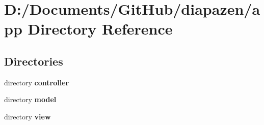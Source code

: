 \section{D\-:/\-Documents/\-Git\-Hub/diapazen/app Directory Reference}
\label{dir_c4a1f68e68402fc978bb0bb178f18d28}
\subsection*{Directories}
\begin{DoxyCompactItemize}
\item 
directory {\bf controller}
\item 
directory {\bf model}
\item 
directory {\bf view}
\end{DoxyCompactItemize}
